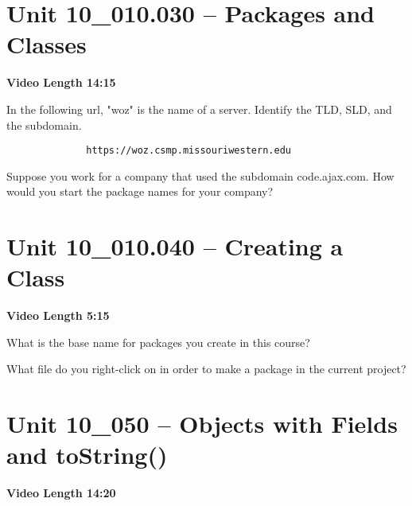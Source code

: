 \documentclass[letterpaper,12pt]{exam}
\newcommand{\unit}{Unit 10}
\begin{document}
\begin{questions}
\section*{\unit\_010.030 -- Packages and Classes} 
\par{\selectfont\textbf{Video Length 14:15}}

\begin{samepage}
    \question In the following url, "woz" is the name of a server.  Identify the TLD, SLD, and the subdomain.
    \begin{verbatim}
              https://woz.csmp.missouriwestern.edu
    \end{verbatim}
    \vspace{5mm}
\end{samepage}

\begin{samepage}
    \question Suppose you work for a company that used the subdomain code.ajax.com.  How would you start the package names for your company?
    \vspace{5mm}
\end{samepage}


\section*{\unit\_010.040 -- Creating a Class} 
\par{\selectfont\textbf{Video Length 5:15}}

\begin{samepage}
    \question What is the base name for packages you create in this course?
    \vspace{5mm}
\end{samepage}

\begin{samepage}
    \question What file do you right-click on in order to make a package in the current project?
    \vspace{5mm}
\end{samepage}


\section*{\unit\_050 -- Objects with Fields and toString()} 
\par{\selectfont\textbf{Video Length 14:20}}


\end{questions}
\end{document}
